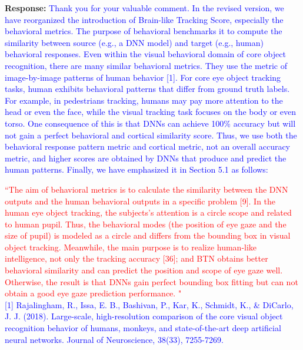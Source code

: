 \documentclass[12pt,journal,onecolumn]{IEEEtran}
\begin{document}
\textbf{Response:} \textcolor{blue}{Thank you for your valuable comment.
In the revised version, we have reorganized the introduction of Brain-like Tracking Score, especially the behavioral metrics. 
The purpose of behavioral benchmarks it to compute the similarity between source (e.g., a DNN model) and target (e.g., human) behavioral responses. 
Even within the visual behavioral domain of core object recognition, there are many similar behavioral metrics.
They use the metric of image-by-image patterns of human behavior [1]. 
For core eye object tracking tasks, human exhibits behavioral patterns that differ from ground truth labels. 
For example, in pedestrians tracking, humans may pay more attention to the head or even the face, while the visual tracking task focuses on the body or even torso.
One consequence of this is that DNNs can achieve 100\% accuracy but will not gain a perfect behavioral and cortical similarity score.
Thus, we use both the behavioral response pattern metric and cortical metric, not an overall accuracy metric, and higher scores are obtained by DNNs that produce and predict the human patterns.
Finally, we have emphasized it in Section 5.1 as follows: 
}

\textcolor{red}{
``The aim of behavioral metrics is to calculate the
similarity between the DNN outputs and the human behavioral outputs in a specific problem [9]. 
In the human eye object tracking, the subjects’s attention is a circle scope and related to human pupil.
Thus, the behavioral modes (the position of eye gaze and the size of pupil) is modeled as a circle and differs from the bounding box in visual object tracking. 
Meanwhile, the main purpose is to realize human-like intelligence, not only the tracking accuracy [36]; and BTN obtains better behavioral similarity and can predict the position and scope of eye gaze well. 
Otherwise, the result is that DNNs gain perfect bounding box fitting but can not obtain a good eye gaze prediction performance. "
} \\
\textcolor{blue}{
	[1] Rajalingham, R., Issa, E. B., Bashivan, P., Kar, K., Schmidt, K., \& DiCarlo, J. J. (2018). Large-scale, high-resolution comparison of the core visual object recognition behavior of humans, monkeys, and state-of-the-art deep artificial neural networks. Journal of Neuroscience, 38(33), 7255-7269.
} \\
\end{document}
